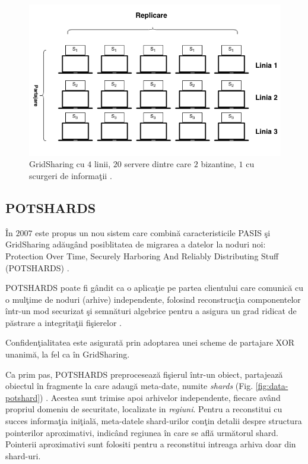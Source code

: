 \documentclass{llncs}
\begin{document}
\begin{figure}[H]
	\includegraphics[width=12cm]{img/GridSharing.png}    %
	\caption{GridSharing cu $4$ linii, $20$ servere dintre care $2$ bizantine, $1$ cu scurgeri de informa\c{t}ii \cite{SB:2005}.}
	\label{fig:grid_sharing}
	\bigskip
\end{figure}


\subsection{POTSHARDS} 
\label{sec:desc_potshards}
\^{I}n $2007$ este propus un nou sistem care combin\u{a} caracteristicile PASIS \c{s}i GridSharing ad\u{a}ug\^{a}nd posiblitatea de migrarea a datelor la noduri noi: Protection Over Time, Securely Harboring And Reliably Distributing Stuff (POTSHARDS) \cite{SGMV:2009}.


POTSHARDS poate fi g\^{a}ndit ca o aplica\c{t}ie pe partea clientului care comunic\u{a} cu o mul\c{t}ime de noduri (arhive) independente, folosind reconstruc\c{t}ia componentelor \^{i}ntr-un mod securizat \c{s}i semn\u{a}turi algebrice pentru a asigura un grad ridicat de p\u{a}strare a integrita\c{t}ii fi\c{s}ierelor \cite{STM:2006}.

Confiden\c{t}ialitatea este asigurat\u{a} prin adoptarea unei scheme de partajare XOR unanim\u{a}, la fel ca \^{i}n GridSharing.

Ca prim pas, POTSHARDS preproceseaz\u{a} fi\c{s}ierul \^{i}ntr-un obiect, partajeaz\u{a} obiectul \^{i}n fragmente la care adaug\u{a} meta-date, numite \textit{shards} (Fig. \ref{fig:data-potshard}) \cite{SGMV:2009}. Acestea sunt trimise apoi arhivelor independente, fiecare av\^{a}nd propriul domeniu de securitate, localizate in \textit{regiuni}. Pentru a reconstitui cu succes informa\c{t}ia ini\c{t}ial\u{a}, meta-datele shard-urilor con\c{t}in detalii despre structura pointerilor aproximativi, indic\^{a}nd regiunea \^{i}n care se afl\u{a} urm\u{a}torul shard. Pointerii aproximativi sunt folositi pentru a reconstitui intreaga arhiva doar din shard-uri.
\end{document}
